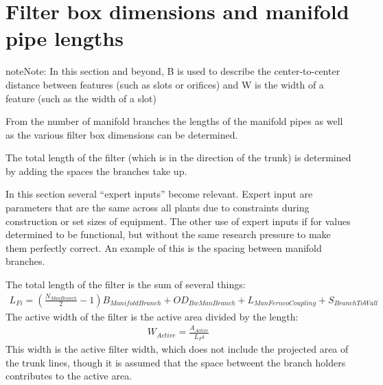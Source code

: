 \documentclass[letterpaper,10pt,english]{sphinxmanual}
\begin{document}
\section{Filter box dimensions and manifold pipe lengths}
\label{\detokenize{Filtration/Filtration_Derivations:filter-box-dimensions-and-manifold-pipe-lengths}}
\begin{sphinxadmonition}{note}{Note:}
In this section and beyond, B is used to describe the center-to-center distance between features (such as slots or orifices) and W is the width of a feature (such as the width of a slot)
\end{sphinxadmonition}

From the number of manifold branches the lengths of the manifold pipes as well as the various filter box dimensions can be determined.

The total length of the filter (which is in the direction of the trunk) is determined by adding the spaces the branches take up.

In this section several “expert inputs” become relevant. Expert input are parameters that are the same across all plants due to constraints during construction or set sizes of equipment. The other use of expert inputs if for values determined to be functional, but without the same research pressure to make them perfectly correct. An example of this is the spacing between manifold branches.

The total length of the filter is the sum of several things:
\begin{equation}\label{equation:Filtration/Filtration_Derivations:Filtration/Filtration_Derivations:33}
\begin{split}L_{Fi} = (\frac{N_{ManBranch}}{2} -1 )B_{ManifoldBranch} + OD_{BwManBranch} + L_{ManFerncoCoupling} + S_{BranchToWall}\end{split}
\end{equation}
The active width of the filter is the active area divided by the length:
\begin{equation}\label{equation:Filtration/Filtration_Derivations:Filtration/Filtration_Derivations:34}
\begin{split}W_{Active} = \frac{A_{Active}}{L_Fi}\end{split}
\end{equation}
This width is the active filter width, which does not include the projected area of the trunk lines, though it is assumed that the space betweent the branch holders contributes to the active area.
\end{document}
